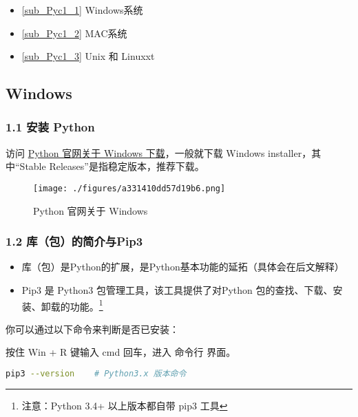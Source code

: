
\begin{itemize}
\item \autoref{sub_Pyc1_1} Windows系统
\item \autoref{sub_Pyc1_2} MAC系统
\item \autoref{sub_Pyc1_3} Unix 和 Linuxxt
\end{itemize}

\subsection{Windows}\label{sub_Pyc1_1}

\subsubsection{1.1 安装 Python}
访问 \href{https://www.python.org/downloads/windows/}{Python 官网关于 Windows 下载}，一般就下载  Windows installer，其中“Stable Releases”是指稳定版本，推荐下载。
\begin{figure}[ht]
\centering
\texttt{[image: ./figures/a331410dd57d19b6.png]}
\caption{Python 官网关于 Windows} \label{fig_Python_1}
\end{figure}

\subsubsection{1.2 库（包）的简介与Pip3}

\begin{itemize}
\item 库（包）是Python的扩展，是Python基本功能的延拓（具体会在后文解释）
\item Pip3 是 Python3 包管理工具，该工具提供了对Python 包的查找、下载、安装、卸载的功能。\footnote{注意：Python 3.4+ 以上版本都自带 pip3 工具}
\end{itemize}

你可以通过以下命令来判断是否已安装：

按住 Win + R 键输入 cmd 回车，进入 命令行 界面。


\begin{lstlisting}[language=bash]
pip3 --version    # Python3.x 版本命令
\end{lstlisting}

